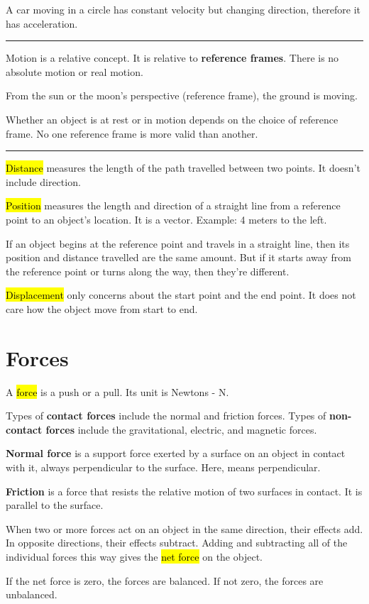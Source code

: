 A car moving in a circle has constant velocity but changing direction, therefore it has acceleration.

\noindent\rule{\textwidth}{0.4pt}

Motion is a relative concept. It is relative to \textbf{reference frames}. There is no absolute motion or real motion.

From the sun or the moon's perspective (reference frame), the ground is moving.

Whether an object is at rest or in motion depends on the choice of reference frame. No one reference frame is more valid than another.

\noindent\rule{\textwidth}{0.4pt}

\hl{Distance} measures the length of the path travelled between two points. It doesn't include direction.

\hl{Position} measures the length and direction of a straight line from a reference point to an object's location. It is a vector. Example: 4 meters to the left.

If an object begins at the reference point and travels in a straight line, then its position and distance travelled are the same amount. But if it starts away from the reference point or turns along the way, then they're different.

\hl{Displacement} only concerns about the start point and the end point. It does not care how the object move from start to end.

\section{Forces}

A \hl{force} is a push or a pull. Its unit is Newtons - N.

Types of \textbf{contact forces} include the normal and friction forces. Types of \textbf{non-contact forces} include the gravitational, electric, and magnetic forces.

\textbf{Normal force} is a support force exerted by a surface on an object in contact with it, always perpendicular to the surface. Here,  means perpendicular.

\textbf{Friction} is a force that resists the relative motion of two surfaces in contact. It is parallel to the surface.

When two or more forces act on an object in the same direction, their effects add. In opposite directions, their effects subtract. Adding and subtracting all of the individual forces this way gives the \hl{net force} on the object.

If the net force is zero, the forces are balanced. If not zero, the forces are unbalanced.
